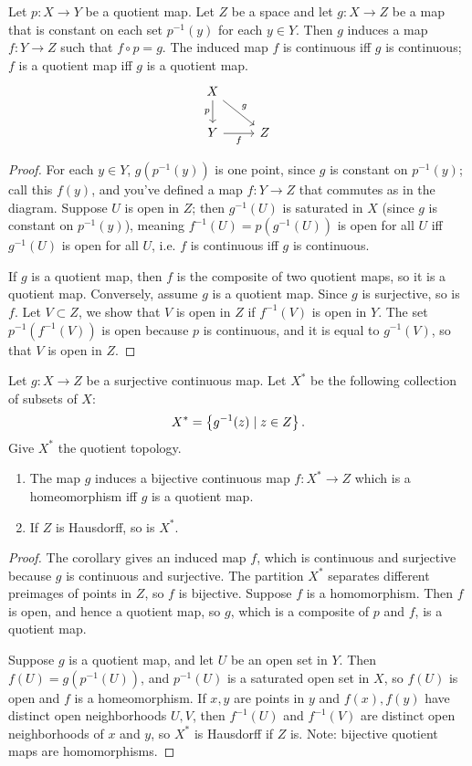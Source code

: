 \documentclass[10pt]{report}
\begin{document}
\begin{theorem}
  Let $p:X \rightarrow Y$ be a quotient map.
  Let $Z$ be a space and let $g:X \rightarrow Z$ be a map that is constant on each set $p^{-1}(y)$ for each $y \in Y$.
  Then $g$ induces a map $f:Y \rightarrow Z$ such that $f \circ p = g$.
  The induced map $f$ is continuous iff $g$ is continuous;
  $f$ is a quotient map iff $g$ is a quotient map.
\[
  \begin{tikzcd}
    X \arrow[swap]{d}{p} \arrow{rd}{g}\\
    Y \arrow[swap]{r}{f} & Z
  \end{tikzcd}
\]
\end{theorem}
\begin{proof}
  For each $y \in Y$, $g(p^{-1}(y))$ is one point, since $g$ is constant on $p^{-1}(y)$; call this $f(y)$, and you've defined a map $f:Y \rightarrow Z$ that commutes as in the diagram.
  Suppose $U$ is open in $Z$; then $g^{-1}(U)$ is saturated in $X$ (since $g$ is constant on $p^{-1}(y)$), meaning $f^{-1}(U) = p(g^{-1}(U))$ is open for all $U$ iff $g^{-1}(U)$ is open for all $U$, i.e. $f$ is continuous iff $g$ is continuous.

  If $g$ is a quotient map, then $f$ is the composite of two quotient maps, so it is a quotient map.
  Conversely, assume $g$ is a quotient map.
  Since $g$ is surjective, so is $f$.
  Let $V \subset Z$, we show that $V$ is open in $Z$ if $f^{-1}(V)$ is open in $Y$.
  The set $p^{-1}(f^{-1}(V))$ is open because $p$ is continuous, and it is equal to $g^{-1}(V)$, so that $V$ is open in $Z$.
\end{proof}

\begin{corollary}
  Let $g:X \rightarrow Z$ be a surjective continuous map.
  Let $X^*$ be the following collection of subsets of $X$:
  \[  X^* = \left\{ g^{-1}(z) \mid z \in Z \right\}. \]
  Give $X^*$ the quotient topology.
  \begin{enumerate}[label={(\alph*)}]
    \item The map $g$ induces a bijective continuous map $f:X^* \rightarrow Z$ which is a homeomorphism iff $g$ is a quotient map.
    \item If $Z$ is Hausdorff, so is $X^*$.
  \end{enumerate}
\end{corollary}
\begin{proof}
  The corollary gives an induced map $f$, which is continuous and surjective because $g$ is continuous and surjective.
  The partition $X^*$ separates different preimages of points in $Z$, so $f$ is bijective.
  Suppose $f$ is a homomorphism.
  Then $f$ is open, and hence a quotient map, so $g$, which is a composite of $p$ and $f$, is a quotient map.

  Suppose $g$ is a quotient map, and let $U$ be an open set in $Y$.
  Then $f(U) = g(p^{-1}(U))$, and $p^{-1}(U)$ is a saturated open set in $X$, so $f(U)$ is open and $f$ is a homeomorphism.
  If $x,y$ are points in $y$ and $f(x),f(y)$ have distinct open neighborhoods $U,V$, then $f^{-1}(U)$ and $f^{-1}(V)$ are distinct open neighborhoods of $x$ and $y$, so $X^*$ is Hausdorff if $Z$ is.
  Note: bijective quotient maps are homomorphisms.
\end{proof}
\end{document}
